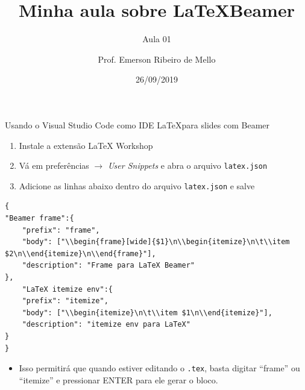 \documentclass{beamer}
\title{Minha aula sobre \LaTeX Beamer}
\subtitle{Aula 01}
\author{Prof. Emerson Ribeiro de Mello}
\institute{
\href{mello@ifsc.edu.br}{mello@ifsc.edu.br}
}
\date{26/09/2019}
\begin{document}
 \begin{frame}[t]\maketitle\end{frame}




\jsonp
\lstset{numbers=none}

\begin{frame}{Usando o Visual Studio Code como IDE \LaTeX para slides com Beamer}
\begin{enumerate}
    \item Instale a extensão LaTeX Workshop
    \item Vá em preferências \(\rightarrow\) \textit{User Snippets} e abra o arquivo \texttt{latex.json}
    \item Adicione as linhas abaixo dentro do arquivo \texttt{latex.json} e salve
\end{enumerate}

\begin{lstlisting}
{
"Beamer frame":{
    "prefix": "frame",
    "body": ["\\begin{frame}[wide]{$1}\n\\begin{itemize}\n\t\\item $2\n\\end{itemize}\n\\end{frame}"],
    "description": "Frame para LaTeX Beamer"
},
    "LaTeX itemize env":{
    "prefix": "itemize",
    "body": ["\\begin{itemize}\n\t\\item $1\n\\end{itemize}"],
    "description": "itemize env para LaTeX"
}
}
\end{lstlisting}
\begin{itemize}
    \item Isso permitirá que quando estiver editando o \texttt{.tex},  basta digitar ``frame'' ou ``itemize'' e pressionar ENTER para ele gerar o bloco.
\end{itemize}
\end{frame}
\end{document}
